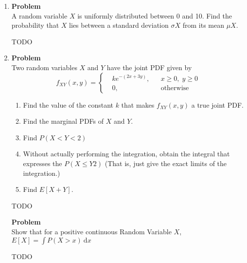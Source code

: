 \documentclass[12pt]{article}
\newenvironment{Ex}{\textbf{Problem}\vspace{.75em}\\}{}
\newcommand{\dd}[1]{\:\mathrm{d}{#1}}
\begin{document}
\begin{enumerate}
\begin{Ex}
\begin{solution}
\begin{enumerate}
\begin{equation}
\begin{aligned}
            \implies P(\text{none defective}) &= 0.0219 \\
          \end{aligned}
        \end{equation}
      \end{enumerate}
    \end{solution}
  \end{Ex}
\item
  \begin{Ex}
    A random variable $X$ is uniformly distributed between 0 and
    10. Find the probability that $X$ lies between a standard deviation
   $\sigma X$ from its mean $\mu X$.
    \begin{solution} \hfill
      {\huge TODO}
    \end{solution}
  \end{Ex}
\item
  \begin{Ex}
    Two random variables $X$ and $Y$ have the joint PDF given by
    \begin{equation}
      \label{eq:6-question}
      f_{XY}(x,y) = \left\{
        \begin{aligned}
          & ke^{-(2x+3y)}, && x \ge 0,\; y \ge 0 \\
          & 0, && \text{otherwise}
        \end{aligned} \right.
      \end{equation}
      \begin{enumerate}
      \item Find the value of the constant $k$ that makes $f_{XY}(x,
        y)$ a true joint PDF.
      \item Find the marginal PDFs of $X$ and $Y$.
      \item Find $P(X<Y<2)$
      \item Without actually performing the integration, obtain the
        integral that expresses the $P(X \le Y2)$ (That is, just give
        the exact limits of the integration.)
      \item Find $E[X +Y]$.
      \end{enumerate}
      \begin{solution} \hfill
        {\huge TODO}
    \end{solution}
  \end{Ex}
  \begin{Ex}
    Show that for a positive continuous Random Variable $X$, $E[X] =
    \int P(X > x) \dd{x}$
    \begin{solution} \hfill
      {\huge TODO}
    \end{solution}
  \end{Ex}
\end{enumerate}
\end{document}
